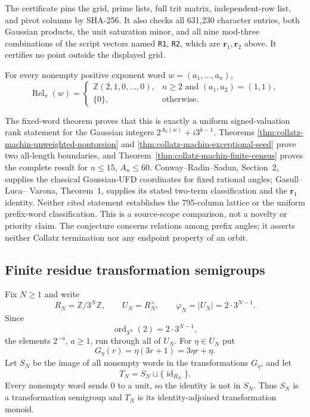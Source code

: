 The certificate pins the grid, prime lists, full trit matrix, independent-row
list, and pivot columns by SHA-256.  It also checks all 631,230 character
entries, both Gaussian products, the unit saturation minor, and all nine
mod-three combinations of the script vectors named \texttt{R1}, \texttt{R2},
which are $\mathbf r_1,\mathbf r_2$ above.  It certifies no point outside the
displayed grid.

\begin{conjecture}
\label{conj:collatz-machin-rigidity}
For every nonempty positive exponent word $w=(a_1,\ldots,a_n)$,
\[
 \operatorname{Rel}_{\pi}(w)=
 \begin{cases}
 \mathbb Z(2,1,0,\ldots,0),
   & n\geq2\text{ and }(a_1,a_2)=(1,1),\\
 \{0\},&\text{otherwise}.
 \end{cases}
\]
\end{conjecture}

The fixed-word theorem proves that this is exactly a uniform signed-valuation
rank statement for the Gaussian integers
$2^{A_k(w)}+i3^{k-1}$.  Theorems
\ref{thm:collatz-machin-unweighted-nontorsion} and
\ref{thm:collatz-machin-exceptional-seed} prove two all-length boundaries, and
Theorem~\ref{thm:collatz-machin-finite-census} proves the complete result for
$n\leq15$, $A_n\leq60$.  Conway--Radin--Sadun, Section~2, supplies the
classical Gaussian-UFD coordinates for fixed rational angles; Gasull--Luca--
Varona, Theorem~1, supplies its stated two-term classification and the
$\mathbf r_1$ identity.  Neither cited statement establishes the 795-column
lattice or the uniform prefix-word classification.  This is a source-scope
comparison, not a novelty or priority claim.  The conjecture concerns
relations among prefix angles; it asserts neither Collatz termination nor any
endpoint property of an orbit.

\subsection{Finite residue transformation semigroups}

Fix $N\geq1$ and write
\[
 R_N=\mathbb Z/3^N\mathbb Z,
 \qquad U_N=R_N^\times,
 \qquad \varphi_N=|U_N|=2\cdot3^{N-1}.
\]
Since
\[
 \operatorname{ord}_{3^N}(2)=2\cdot3^{N-1},
\]
the elements $2^{-a}$, $a\geq1$, run through all of $U_N$.  For
$\eta\in U_N$ put
\[
 G_\eta(r)=\eta(3r+1)=3\eta r+\eta.
\]
Let $S_N$ be the image of all nonempty words in the transformations $G_\eta$,
and let
\[
 T_N=S_N\sqcup\{\operatorname{id}_{R_N}\}.
\]
Every nonempty word sends $0$ to a unit, so the identity is not in $S_N$.
Thus $S_N$ is a transformation semigroup and $T_N$ is its identity-adjoined
transformation monoid.

